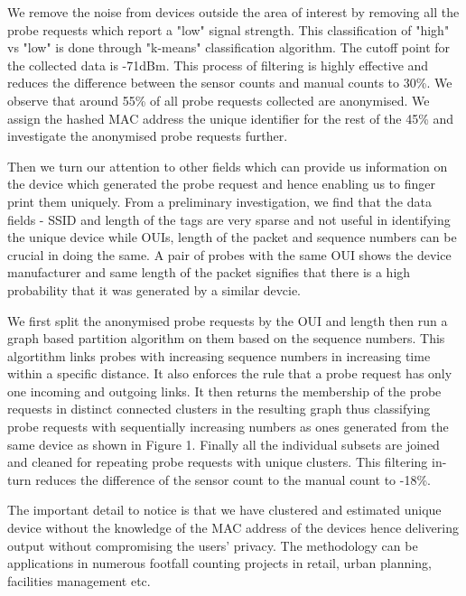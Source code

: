\documentclass[11t, a4paper, twocolumn]{article}
\begin{document}
	We remove the noise from devices outside the area of interest 
	by removing all the probe requests which report a "low" signal strength.
	This classification of "high" vs "low" is done through "k-means"
	classification algorithm.
	The cutoff point for the collected data is -71dBm.
	This process of filtering is highly effective and reduces the difference
	between the sensor counts and manual counts to 30\%. We observe that
	around 55\% of all probe requests collected are anonymised.
	We assign the hashed MAC address the unique identifier for the rest of
	the 45\% and investigate the anonymised probe requests further.
	
	Then we turn our attention to other fields which can provide us information
	on the device which generated the probe request and hence enabling us to 
	finger print them uniquely.
	From a preliminary investigation, we find that the data fields - SSID and length of
	the tags are very sparse and not useful in identifying the unique device while 
	OUIs, length of the packet and sequence numbers can be crucial in doing the same.
	A pair of probes with the same OUI shows the device manufacturer and same length of the packet signifies that 
	there is a high probability that it was generated by a similar devcie.
	
	We first split the anonymised probe requests by the OUI and length then run a 
	graph based partition algorithm on them based on the sequence numbers. This 
	algortithm links probes with increasing sequence numbers in increasing time within a
	specific distance. It also enforces the rule that a probe request has only one 
	incoming and outgoing links. It then returns the membership of the probe requests in
	distinct connected clusters in the resulting graph thus classifying probe requests
	with sequentially increasing numbers as ones generated from the same device as shown in Figure 1. Finally
	all the individual subsets are joined and cleaned for repeating probe requests with
	unique clusters. This filtering in-turn reduces the difference of the sensor count to the manual count to 
	-18\%.

	The important detail to notice is that we have clustered and estimated unique device
	without the knowledge of the MAC address of the devices hence delivering output 
	without compromising the users' privacy. The methodology can be applications in 
	numerous footfall counting projects in retail, urban planning, facilities management etc.
	

	\printbibliography[title={References}]
\end{document}
